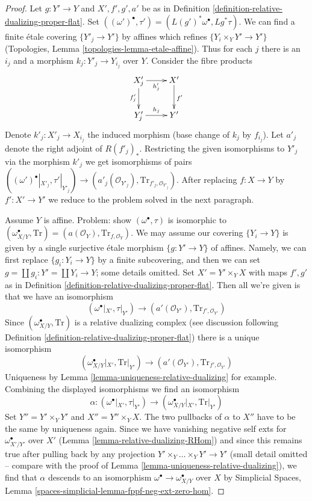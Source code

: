 \begin{proof}
Let $g : Y' \to Y$ and $X', f', g', a'$ be as in
Definition \ref{definition-relative-dualizing-proper-flat}.
Set $((\omega')^\bullet, \tau') = (L(g')^*\omega^\bullet, Lg^*\tau)$.
We can find a finite \'etale covering
$\{Y'_j \to Y'\}$ by affines which refines $\{Y_i \times_Y Y' \to Y'\}$
(Topologies, Lemma \ref{topologies-lemma-etale-affine}).
Thus for each $j$ there is an $i_j$ and a morphism
$k_j : Y'_j \to Y_{i_j}$ over $Y$. Consider the fibre products
$$
\xymatrix{
X'_j \ar[r]_{h_j'} \ar[d]_{f'_j} &
X' \ar[d]^{f'} \\
Y'_j \ar[r]^{h_j} & Y'
}
$$
Denote $k'_j : X'_j \to X_{i_j}$ the induced morphism (base change
of $k_j$ by $f_{i_j}$). Let $a'_j$ denote the right adjoint of $R(f'_j)_*$. Restricting the given isomorphisms to $Y'_j$
via the morphism $k'_j$ we get isomorphisms of pairs
$((\omega')^\bullet|_{X'_j}, \tau'|_{Y'_j})
\to (a'_j(\mathcal{O}_{Y'_j}), \text{Tr}_{f'_j, \mathcal{O}_{Y'_j}})$.
After replacing $f : X \to Y$ by $f' : X' \to Y'$ we reduce to the
problem solved in the next paragraph.

\medskip\noindent
Assume $Y$ is affine. Problem: show $(\omega^\bullet, \tau)$ is
isomorphic to $(\omega_{X/Y}^\bullet, \text{Tr}) =
(a(\mathcal{O}_Y), \text{Tr}_{f, \mathcal{O}_Y})$.
We may assume our covering $\{Y_i \to Y\}$ is given by a single
surjective \'etale morphism $\{g : Y' \to Y\}$ of affines.
Namely, we can first replace $\{g_i: Y_i \to Y\}$ by a finite
subcovering, and then we can set $g = \coprod g_i :  Y' = \coprod Y_i \to Y$;
some details omitted. Set $X' = Y' \times_Y X$ with maps
$f', g'$ as in Definition \ref{definition-relative-dualizing-proper-flat}.
Then all we're given is that we have an isomorphism
$$
(\omega^\bullet|_{X'}, \tau|_{Y'}) \to
(a'(\mathcal{O}_{Y'}), \text{Tr}_{f', \mathcal{O}_{Y'}})
$$
Since $(\omega_{X/Y}^\bullet, \text{Tr})$ is a relative dualizing complex
(see discussion following
Definition \ref{definition-relative-dualizing-proper-flat})
there is a unique isomorphism
$$
(\omega_{X/Y}^\bullet|_{X'}, \text{Tr}|_{Y'}) \to
(a'(\mathcal{O}_{Y'}), \text{Tr}_{f', \mathcal{O}_{Y'}})
$$
Uniqueness by Lemma \ref{lemma-uniqueness-relative-dualizing} for example.
Combining the displayed isomorphisms we find an isomorphism
$$
\alpha :
(\omega^\bullet|_{X'}, \tau|_{Y'}) \to
(\omega_{X/Y}^\bullet|_{X'}, \text{Tr}|_{Y'})
$$
Set $Y'' = Y' \times_Y Y'$ and $X'' = Y'' \times_Y X$. The two
pullbacks of $\alpha$ to $X''$ have to be the same by uniqueness again.
Since we have vanishing negative self exts for
$\omega_{X'/Y'}^\bullet$ over $X'$ (Lemma \ref{lemma-relative-dualizing-RHom})
and since this remains true after pulling back by any projection
$Y' \times_Y \ldots \times_Y Y' \to Y'$ (small detail omitted -- compare
with the proof of Lemma \ref{lemma-uniqueness-relative-dualizing}),
we find that $\alpha$ descends to an isomorphism
$\omega^\bullet \to \omega_{X/Y}^\bullet$
over $X$ by Simplicial Spaces, Lemma
\ref{spaces-simplicial-lemma-fppf-neg-ext-zero-hom}.
\end{proof}

